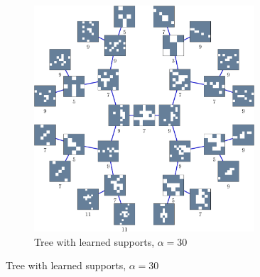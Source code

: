 \begin{figure}[!ht]
\begin{subfigure}[b]{0.49\textwidth}
\includegraphics[width=0.9\textwidth]{figures/tree-gradient-vs-sequential/xp_learnsupp256_curvelet_decomp3_tree-binary_dpth4_supp-diracs_usegrad1_every5_add5_totinit0_totadd279_alpha30_tree.pdf} 
	\caption{Tree with learned supports, $\alpha=30$}
\end{subfigure}
\end{figure}
